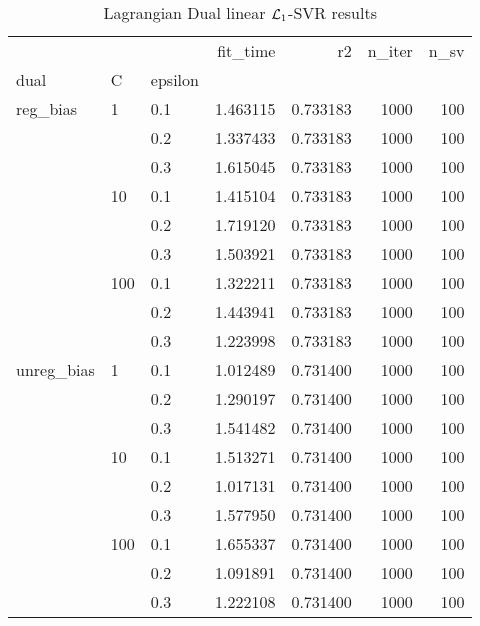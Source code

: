 \begin{table}[H]
\centering
\caption{Lagrangian Dual linear $\protect \mathcal{L}_1$-SVR results}
\label{linear_lagrangian_dual_l1_svr_cv_results}
\begin{tabular}{lllrrrr}
\toprule
           &     &     &  fit\_time &        r2 &  n\_iter &  n\_sv \\
dual & C & epsilon &           &           &         &       \\
\midrule
reg\_bias & 1   & 0.1 &  1.463115 &  0.733183 &    1000 &   100 \\
           &     & 0.2 &  1.337433 &  0.733183 &    1000 &   100 \\
           &     & 0.3 &  1.615045 &  0.733183 &    1000 &   100 \\
           & 10  & 0.1 &  1.415104 &  0.733183 &    1000 &   100 \\
           &     & 0.2 &  1.719120 &  0.733183 &    1000 &   100 \\
           &     & 0.3 &  1.503921 &  0.733183 &    1000 &   100 \\
           & 100 & 0.1 &  1.322211 &  0.733183 &    1000 &   100 \\
           &     & 0.2 &  1.443941 &  0.733183 &    1000 &   100 \\
           &     & 0.3 &  1.223998 &  0.733183 &    1000 &   100 \\
unreg\_bias & 1   & 0.1 &  1.012489 &  0.731400 &    1000 &   100 \\
           &     & 0.2 &  1.290197 &  0.731400 &    1000 &   100 \\
           &     & 0.3 &  1.541482 &  0.731400 &    1000 &   100 \\
           & 10  & 0.1 &  1.513271 &  0.731400 &    1000 &   100 \\
           &     & 0.2 &  1.017131 &  0.731400 &    1000 &   100 \\
           &     & 0.3 &  1.577950 &  0.731400 &    1000 &   100 \\
           & 100 & 0.1 &  1.655337 &  0.731400 &    1000 &   100 \\
           &     & 0.2 &  1.091891 &  0.731400 &    1000 &   100 \\
           &     & 0.3 &  1.222108 &  0.731400 &    1000 &   100 \\
\bottomrule
\end{tabular}
\end{table}
